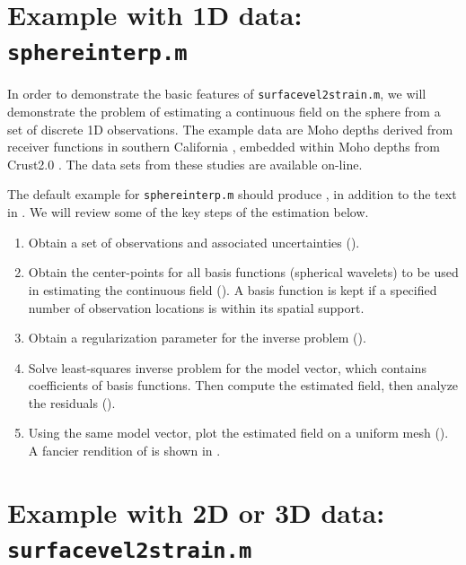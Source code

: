 \documentclass[11pt,titlepage,fleqn]{article}
\begin{document}
\section{Example with 1D data: {\tt sphereinterp.m}}
\label{sec:sphereinterp}

In order to demonstrate the basic features of \verb+surfacevel2strain.m+, we will demonstrate the problem of estimating a continuous field on the sphere from a set of discrete 1D observations. The example data are Moho depths derived from receiver functions in southern California \citep{YanClayton2007}, embedded within Moho depths from Crust2.0 \citep{Crust2}. The data sets from these studies are available on-line.

The default example for \verb+sphereinterp.m+ should produce , in addition to the text in . We will review some of the key steps of the estimation below.
%
\begin{enumerate}
\item Obtain a set of observations and associated uncertainties ().
\item Obtain the center-points for all basis functions (spherical wavelets) to be used in estimating the continuous field (). A basis function is kept if a specified number of observation locations is within its spatial support.
\item Obtain a regularization parameter for the inverse problem ().
\item Solve  least-squares inverse problem for the model vector, which contains coefficients of basis functions. Then compute the estimated field, then analyze the residuals ().
\item Using the same model vector, plot the estimated field on a uniform mesh (). A fancier rendition of  is shown in .
\end{enumerate}


\section{Example with 2D or 3D data: {\tt surfacevel2strain.m}}
\label{sec:surfacevel2strain}
\end{document}
